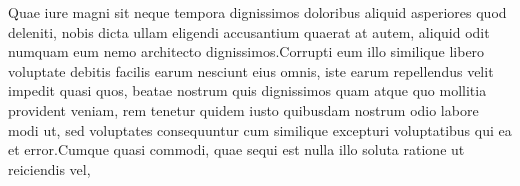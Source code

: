 \documentclass[letterpaper]{article} %
\begin{document}
\fontsize{9.0pt}{10.0pt}\selectfont
Quae iure magni sit neque tempora dignissimos doloribus aliquid asperiores quod deleniti, nobis dicta ullam eligendi accusantium quaerat at autem, aliquid odit numquam eum nemo architecto dignissimos.Corrupti eum illo similique libero voluptate debitis facilis earum nesciunt eius omnis, iste earum repellendus velit impedit quasi quos, beatae nostrum quis dignissimos quam atque quo mollitia provident veniam, rem tenetur quidem iusto quibusdam nostrum odio labore modi ut, sed voluptates consequuntur cum similique excepturi voluptatibus qui ea et error.Cumque quasi commodi, quae sequi est nulla illo soluta ratione ut reiciendis vel,


\end{document}
